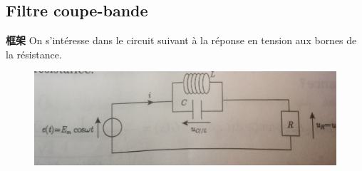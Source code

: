 \documentclass[12pt]{book}
\theoremstyle{definition}\newtheorem{dfn}{Définition}[chapter]
\theoremstyle{plain}\newtheorem{thm}{Théorème}[chapter]
\theoremstyle{plain}\newtheorem{prp}{Proposition}[chapter]
\theoremstyle{plain}\newtheorem{lem}{\bf Lemme}[chapter]
\theoremstyle{plain}\newtheorem{axm}{\bf Axiome}[chapter]
\theoremstyle{plain}\newtheorem{lmm}{\bf Lemme}[chapter]
\theoremstyle{plain}\newtheorem{cor}{\bf Corollaire}[chapter]
\theoremstyle{remark}\newtheorem{rem}{Remarque}[chapter]
\begin{document}
\subsection{Filtre coupe-bande}
\begin{framed}{\textbf{框架}}
	On s'intéresse dans le circuit suivant à la réponse en tension aux bornes de la résistance.
\end{framed}
\begin{figure}[H]
	\centering
	\includegraphics[scale=0.16]{Filtrage//8}
\end{figure}
\end{document}
